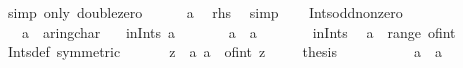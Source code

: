 \begin{isabellebody}
\ {\isacharparenleft}{\kern0pt}simp\ only{\isacharcolon}{\kern0pt}\ double{\isacharunderscore}{\kern0pt}zero{\isacharparenright}{\kern0pt}\isanewline
\ \ \ \ \isamarkupfalse%
\ a\ \isamarkupfalse%
\ {\isacharquery}{\kern0pt}rhs\ \isamarkupfalse%
\ simp\isanewline
\ \ \isamarkupfalse%
\isanewline
{}\isamarkupfalse%
%
\endisatagproof
{\isafoldproof}%
%
\isadelimproof
\isanewline
%
\endisadelimproof
\isanewline
{}\isamarkupfalse%
\ Ints{\isacharunderscore}{\kern0pt}odd{\isacharunderscore}{\kern0pt}nonzero{\isacharcolon}{\kern0pt}\isanewline
\ \ \ a\ {\isacharcolon}{\kern0pt}{\isacharcolon}{\kern0pt}\ {\isachardoublequoteopen}{\isacharprime}{\kern0pt}a{\isacharcolon}{\kern0pt}{\isacharcolon}{\kern0pt}ring{\isacharunderscore}{\kern0pt}char{\isacharunderscore}{\kern0pt}{}{\isachardoublequoteclose}\isanewline
\ \ \ in{\isacharunderscore}{\kern0pt}Ints{\isacharcolon}{\kern0pt}\ {\isachardoublequoteopen}a\ {\isasymin}\ {\isasymint}{\isachardoublequoteclose}\isanewline
\ \ \ {\isachardoublequoteopen}{}\ {\isacharplus}{\kern0pt}\ a\ {\isacharplus}{\kern0pt}\ a\ {\isasymnoteq}\ {}{\isachardoublequoteclose}\isanewline
%
\isadelimproof
%
\endisadelimproof
%
\isatagproof
{}\isamarkupfalse%
\ {\isacharminus}{\kern0pt}\isanewline
\ \ \isamarkupfalse%
\ in{\isacharunderscore}{\kern0pt}Ints\ \isamarkupfalse%
\ {\isachardoublequoteopen}a\ {\isasymin}\ range\ of{\isacharunderscore}{\kern0pt}int{\isachardoublequoteclose}\isanewline
\ \ \ \ \isamarkupfalse%
\ Ints{\isacharunderscore}{\kern0pt}def\ {\isacharbrackleft}{\kern0pt}symmetric{\isacharbrackright}{\kern0pt}\ \isacommand{{\isachardot}{\kern0pt}}\isamarkupfalse%
\isanewline
\ \ \isamarkupfalse%
\ \isamarkupfalse%
\ z\ \ a{\isacharcolon}{\kern0pt}\ {\isachardoublequoteopen}a\ {\isacharequal}{\kern0pt}\ of{\isacharunderscore}{\kern0pt}int\ z{\isachardoublequoteclose}\ \isacommand{{\isachardot}{\kern0pt}{\isachardot}{\kern0pt}}\isamarkupfalse%
\isanewline
\ \ \isamarkupfalse%
\ {\isacharquery}{\kern0pt}thesis\isanewline
\ \ \isamarkupfalse%
\isanewline
\ \ \ \ \isamarkupfalse%
\ {\isachardoublequoteopen}{}\ {\isacharplus}{\kern0pt}\ a\ {\isacharplus}{\kern0pt}\ a\ {\isacharequal}{\kern0pt}\ {}{\isachardoublequoteclose}\isanewline
\ \ \ \ \isamarkupfalse%

\end{isabellebody}

